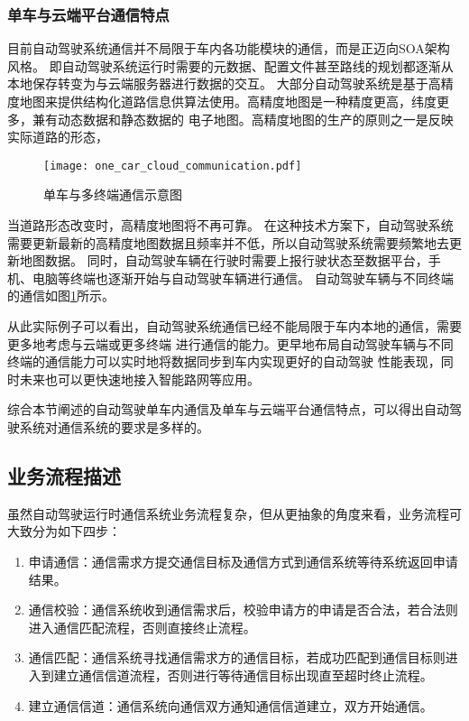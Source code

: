 \subsubsection{单车与云端平台通信特点}
目前自动驾驶系统通信并不局限于车内各功能模块的通信，而是正迈向SOA架构风格。
即自动驾驶系统运行时需要的元数据、配置文件甚至路线的规划都逐渐从本地保存转变为与云端服务器进行数据的交互。
大部分自动驾驶系统是基于高精度地图来提供结构化道路信息供算法使用。高精度地图是一种精度更高，纬度更多，兼有动态数据和静态数据的
电子地图。高精度地图的生产的原则之一是反映实际道路的形态，
\begin{figure}[htb]
  \centering
  \texttt{[image: one\_car\_cloud\_communication.pdf]}
  \caption{单车与多终端通信示意图}
  \label{one_car_cloud_communication}
\end{figure}
当道路形态改变时，高精度地图将不再可靠。
在这种技术方案下，自动驾驶系统需要更新最新的高精度地图数据且频率并不低，所以自动驾驶系统需要频繁地去更新地图数据。
同时，自动驾驶车辆在行驶时需要上报行驶状态至数据平台，手机、电脑等终端也逐渐开始与自动驾驶车辆进行通信。
自动驾驶车辆与不同终端的通信如图\ref{one_car_cloud_communication}所示。

从此实际例子可以看出，自动驾驶系统通信已经不能局限于车内本地的通信，需要更多地考虑与云端或更多终端
进行通信的能力。更早地布局自动驾驶车辆与不同终端的通信能力可以实时地将数据同步到车内实现更好的自动驾驶
性能表现，同时未来也可以更快速地接入智能路网等应用。

综合本节阐述的自动驾驶单车内通信及单车与云端平台通信特点，可以得出自动驾驶系统对通信系统的要求是多样的。


\subsection{业务流程描述}
虽然自动驾驶运行时通信系统业务流程复杂，但从更抽象的角度来看，业务流程可大致分为如下四步：
\begin{enumerate}
  \item 申请通信：通信需求方提交通信目标及通信方式到通信系统等待系统返回申请结果。
  \item 通信校验：通信系统收到通信需求后，校验申请方的申请是否合法，若合法则进入通信匹配流程，否则直接终止流程。
  \item 通信匹配：通信系统寻找通信需求方的通信目标，若成功匹配到通信目标则进入到建立通信信道流程，否则进行等待通信目标出现直至超时终止流程。
  \item 建立通信信道：通信系统向通信双方通知通信信道建立，双方开始通信。
\end{enumerate}

